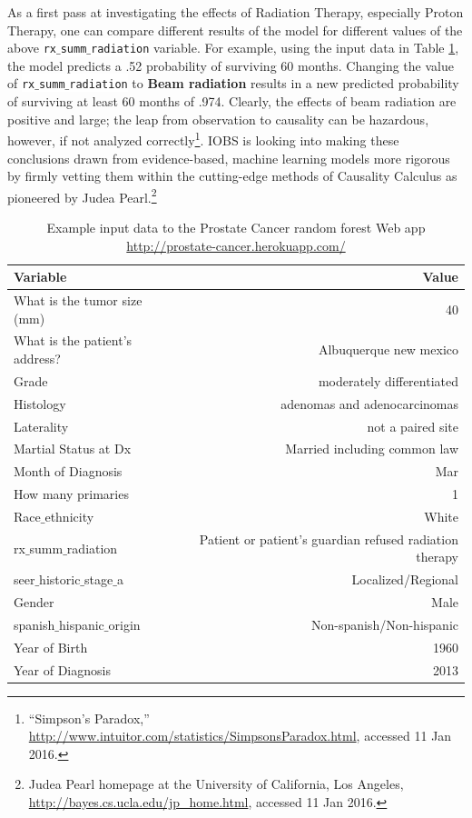 \documentclass[a4paper,11pt]{article}
\newcommand{\codewhite}[1]{\colorbox{white}{\texttt{#1}}}
\begin{document}
As a first pass at investigating the effects of Radiation Therapy, especially Proton Therapy, one can compare different results of the model for different values of the above \codewhite{rx$\_$summ$\_$radiation} variable. For example, using the input data in Table \ref{tab:abq}, the model predicts a .52 probability of surviving 60 months. Changing the value of \codewhite{rx$\_$summ$\_$radiation} to \textbf{Beam radiation} results in a new predicted probability of surviving at least 60 months of .974.
Clearly, the effects of beam radiation are positive and large; the leap from observation to causality can be hazardous, however, if not analyzed correctly\footnote{``Simpson's Paradox,'' \url{http://www.intuitor.com/statistics/SimpsonsParadox.html}, accessed 11 Jan 2016.}. IOBS is looking into making these conclusions drawn from evidence-based, machine learning models more rigorous by firmly vetting them within the cutting-edge methods of Causality Calculus as pioneered by Judea Pearl.\footnote{Judea Pearl homepage at the University of California, Los Angeles, \url{http://bayes.cs.ucla.edu/jp_home.html}, accessed 11 Jan 2016.}





\begin{table}[tbp]
\begin{center}
\begin{tabular}{lr}
  \toprule
  Variable  & Value \\ 
\midrule
  What is the tumor size (mm) & 40 \\  
  What is the patient's address? & Albuquerque new mexico \\ 
  Grade & moderately differentiated \\  
  Histology & adenomas and adenocarcinomas \\ 
  Laterality & not a paired site \\  
 Martial Status at Dx & Married including common law \\  
 Month of Diagnosis & Mar \\  
 How many primaries & 1 \\  
  Race$\_$ethnicity & White \\  
 rx$\_$summ$\_$radiation & Patient or patient's guardian refused radiation therapy \\
  seer$\_$historic$\_$stage$\_$a  & Localized/Regional \\ 
  Gender & Male \\  
  spanish$\_$hispanic$\_$origin & Non-spanish/Non-hispanic \\ 
 Year of Birth & 1960 \\  
  Year of Diagnosis & 2013 \\
\bottomrule
\end{tabular}
\caption{Example input data to the Prostate Cancer random forest Web app \url{http://prostate-cancer.herokuapp.com/}}
\label{tab:abq}
\end{center}
\end{table}
\end{document}
